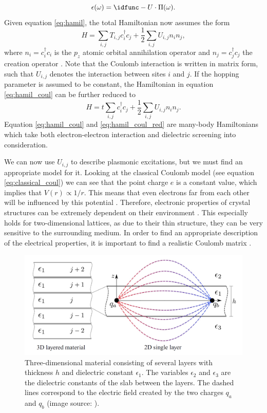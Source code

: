 \begin{equation}\label{eq:dielectric}
    \epsilon(\omega) = \idfunc - U\cdot \Pi(\omega).
\end{equation}
Given equation \ref{eq:hamil}, the total Hamiltonian now assumes the form
\begin{equation}\label{eq:hamil_coul}
    H = \sum_{i,j}T_{i,j} c_i^\dagger c_j + \frac{1}{2}\sum_{i,j} U_{i,j} n_i n_j,
\end{equation}
where $n_i = c_i^\dagger c_i$ is the $p_z$ atomic orbital annihilation operator and $n_j = c_j^\dagger c_j$ the creation operator \cite{Westerhout2021}. Note that the Coulomb interaction is written in matrix form, such that $U_{i,j}$ denotes the interaction between sites $i$ and $j$. If the hopping parameter is assumed to be constant, the Hamiltonian in equation \ref{eq:hamil_coul} can be further reduced to \cite{Roesner2015}
\begin{equation}\label{eq:hamil_coul_red}
    H = t \sum_{i,j} c_i^\dagger c_j + \frac{1}{2}\sum_{i,j} U_{i,j} n_i n_j.
\end{equation}
Equation \ref{eq:hamil_coul} and \ref{eq:hamil_coul_red} are many-body Hamiltonians which take both electron-electron interaction and dielectric screening into consideration. 

We can now use $U_{i,j}$ to describe plasmonic excitations, but we must find an appropriate model for it. Looking at the classical Coulomb model (see equation \ref{eq:classical_coul}) we can see that the point charge $e$ is a constant value, which implies that $V(r)\propto 1/r$. This means that even electrons far from each other will be influenced by this potential \cite{Roesner2016}. Therefore, electronic properties of crystal structures can be extremely dependent on their environment \cite{Cho2018}. This especially holds for two-dimensional lattices, as due to their thin structure, they can be very sensitive to the surrounding medium. In order to find an appropriate description of the electrical properties, it is important to find a realistic Coulomb matrix \cite{Roesner2016}.

\begin{figure}[ht]
    \centering
    \includegraphics[width=.7\textwidth]{img/screening.PNG}
    \caption{Three-dimensional material consisting of several layers with thickness $h$ and dielectric constant $\epsilon_1$. The variables $\epsilon_2$ and $\epsilon_3$ are the dielectric constants of the slab between the layers. The dashed lines correspond to the electric field created by the two charges $q_a$ and $q_b$ \cite{Roesner2015} (image source: \textcite{Roesner2015}).}
    \label{fig:screened}
\end{figure}

